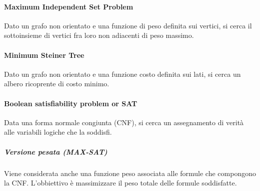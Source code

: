 \documentclass[\main/main.tex]{subfiles}
\begin{document}
\begin{multicols}{2}
  \paragraph*{Maximum Independent Set Problem}
  Dato un grafo non orientato e una funzione di peso definita sui vertici, si cerca il sottoinsieme di vertici fra loro non adiacenti di peso massimo.

  \paragraph*{Minimum Steiner Tree}
  Dato un grafo non orientato e una funzione costo definita sui lati, si cerca un albero ricoprente di costo minimo.

  \paragraph*{Boolean satisfiability problem or SAT}
  Data una forma normale congiunta (CNF), si cerca un assegnamento di verità alle variabili logiche che la soddisfi.

  \subparagraph*{Versione pesata (MAX-SAT)}
  Viene considerata anche una funzione peso associata alle formule che compongono la CNF. L'obbiettivo è massimizzare il peso totale delle formule soddisfatte.
\end{multicols}
\end{document}
